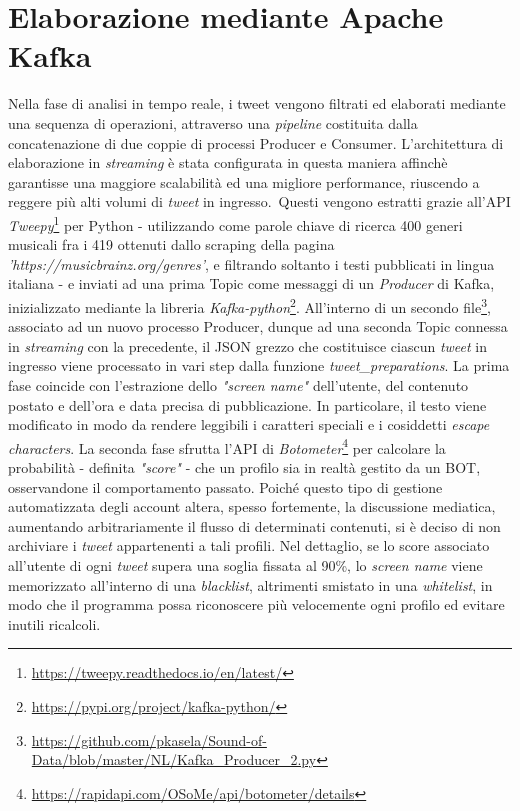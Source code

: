 \documentclass[12pt, a4paper, twocolumn]{article} %
\begin{document}
\section{Elaborazione mediante Apache Kafka}
Nella fase di analisi in tempo reale, i tweet vengono filtrati ed elaborati mediante una sequenza di operazioni, attraverso una \textit{pipeline} costituita dalla concatenazione di due coppie di processi Producer e Consumer. L'architettura di elaborazione in \textit{streaming} è stata configurata in questa maniera affinchè garantisse una maggiore scalabilità ed una migliore performance, riuscendo a reggere più alti volumi di \textit{tweet} in ingresso.\ 
Questi vengono estratti grazie all'API \textit{Tweepy}\footnote{\url{https://tweepy.readthedocs.io/en/latest/}} per Python - utilizzando come parole chiave di ricerca 400 generi musicali fra i 419 ottenuti dallo scraping della pagina \textit{'https://musicbrainz.org/genres'}, e filtrando soltanto i testi pubblicati in lingua italiana - e inviati ad una prima Topic come messaggi di un \textit{Producer} di Kafka, inizializzato mediante la libreria \textit{Kafka-python}\footnote{\url{https://pypi.org/project/kafka-python/}}. 
All'interno di un secondo file\footnote{\url{https://github.com/pkasela/Sound-of-Data/blob/master/NL/Kafka_Producer_2.py}}, associato ad un nuovo processo Producer, dunque ad una seconda Topic connessa in \textit{streaming} con la precedente, il JSON grezzo che costituisce ciascun \textit{tweet} in ingresso viene processato in vari step dalla funzione \textit{tweet\_preparations}. La prima fase coincide con l'estrazione dello \textit{"screen name"} dell'utente, del contenuto postato e dell'ora e data precisa di pubblicazione. 
In particolare, il testo viene modificato in modo da rendere leggibili i caratteri speciali e i cosiddetti \textit{escape characters}. 
La seconda fase sfrutta l'API di \textit{Botometer}\footnote{\url{https://rapidapi.com/OSoMe/api/botometer/details}} per calcolare la probabilità - definita \textit{"score"} - che un profilo sia in realtà gestito da un BOT, osservandone il comportamento passato.
Poiché questo tipo di gestione automatizzata degli account altera, spesso fortemente, la discussione mediatica, aumentando arbitrariamente il flusso di determinati contenuti, si è deciso di non archiviare i \textit{tweet} appartenenti a tali profili. 
Nel dettaglio, se lo score associato all'utente di ogni \textit{tweet} supera una soglia fissata al 90\%, lo \textit{screen name} viene memorizzato all'interno di una \textit{blacklist}, altrimenti smistato in una \textit{whitelist}, in modo che il programma possa riconoscere più velocemente ogni profilo ed evitare inutili ricalcoli. 
\end{document}
